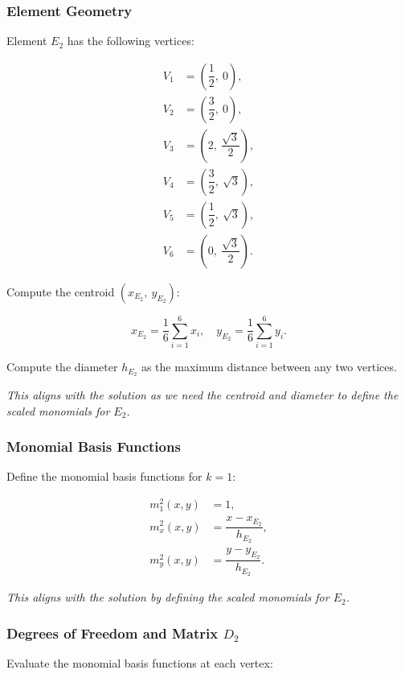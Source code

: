 \documentclass[class=article, crop=false]{standalone}
\begin{document}
\subsubsection{Element Geometry}

Element $E_2$ has the following vertices:

\[
\begin{aligned}
V_1 &= \left( \dfrac{1}{2},\ 0 \right), \\ 
V_2 &= \left( \dfrac{3}{2},\ 0 \right), \\ 
V_3 &= \left( 2,\ \dfrac{\sqrt{3}}{2} \right), \\
V_4 &= \left( \dfrac{3}{2},\ \sqrt{3} \right), \\
V_5 &= \left( \dfrac{1}{2},\ \sqrt{3} \right), \\ 
V_6 &= \left( 0,\ \dfrac{\sqrt{3}}{2} \right).
\end{aligned}
\]

Compute the centroid $(x_{E_2},\ y_{E_2})$:

\[
x_{E_2} = \dfrac{1}{6} \sum_{i=1}^6 x_i, \quad y_{E_2} = \dfrac{1}{6} \sum_{i=1}^6 y_i.
\]

Compute the diameter $h_{E_2}$ as the maximum distance between any two vertices.

\noindent
\textit{This aligns with the solution as we need the centroid and diameter to define the scaled monomials for $E_2$.}

\subsubsection{Monomial Basis Functions}

Define the monomial basis functions for $k = 1$:

\[
\begin{aligned}
m_1^2(x, y) &= 1, \\
m_x^2(x, y) &= \dfrac{x - x_{E_2}}{h_{E_2}}, \\
m_y^2(x, y) &= \dfrac{y - y_{E_2}}{h_{E_2}}.
\end{aligned}
\]

\noindent
\textit{This aligns with the solution by defining the scaled monomials for $E_2$.}

\subsubsection{Degrees of Freedom and Matrix $D_2$}

Evaluate the monomial basis functions at each vertex:
\end{document}
